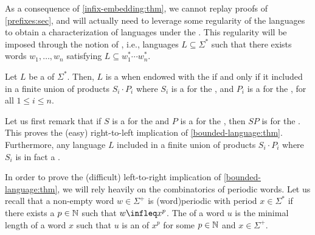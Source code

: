 \AP As a consequence of \cref{infix-embedding:thm}, we cannot replay
proofs of \cref{prefixes:sec}, and will
actually need to leverage some regularity of the languages to obtain a
characterization of  languages under the . This regularity will be imposed through the notion of , i.e., languages $L \subseteq \Sigma^*$ such that there exists words
$w_1, \dots, w_n$ satisfying $L \subseteq w_1^* \cdots w_n^*$.

\begin{theorem}[restate=bounded-language:thm,label=bounded-language:thm]
    Let $L$ be a  of $\Sigma^*$. Then,
    $L$ is a  when endowed with the 
     if and only if it included in a finite union of 
    products $S_i \cdot P_i$ where 
    $S_i$ is a  for the , and 
    $P_i$ is a  for the ,
    for all $1 \leq i \leq n$.
\end{theorem}

Let us first remark that if $S$ is a  for the 
and $P$ is a  for the , then $SP$ is
 for the . This proves the (easy)
right-to-left implication of \cref{bounded-language:thm}. Furthermore, any
language $L$ included in a finite union of products $S_i \cdot P_i$ where $S_i$
is in fact a .

\AP In order to prove the (difficult) left-to-right implication of
\cref{bounded-language:thm}, we will rely heavily on the
combinatorics of periodic words. Let us recall that a non-empty word $w \in
\Sigma^+$ is \intro(word){periodic} with period $x \in \Sigma^*$ if there
exists a $p \in \mathbb{N}$ such that $w \infleq x^p$. The  of
a word $u$ is the minimal length of a word $x$ such that $u$ is an 
of $x^p$ for some $p \in \mathbb{N}$ and $x \in \Sigma^+$.

